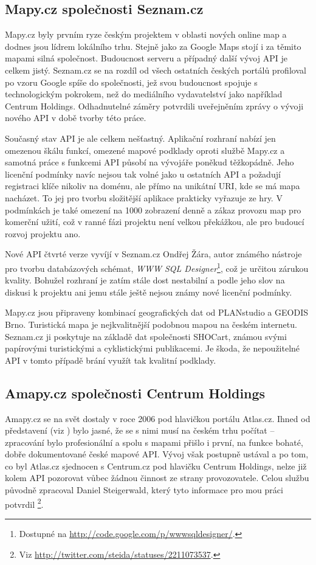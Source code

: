\subsection{Mapy.cz společnosti Seznam.cz}
Mapy.cz byly prvním ryze českým projektem v oblasti nových online map
a dodnes jsou lídrem lokálního trhu. Stejně jako za Google Maps stojí
i za těmito mapami silná společnost. Budoucnost serveru a případný
další vývoj API je celkem jistý. Seznam.cz se na rozdíl od všech
ostatních českých portálů profiloval po vzoru Google spíše do
společnosti, jež svou budoucnost spojuje s technologickým pokrokem,
než do mediálního vydavatelství jako například Centrum Holdings.
Odhadnutelné záměry potvrdili uveřejněním zprávy o vývoji nového
API \cite{apiSeznam} v době tvorby této práce.

Současný stav API je ale celkem nešťastný. Aplikační rozhraní nabízí
jen omezenou škálu funkcí, omezené mapové podklady oproti službě
Mapy.cz a samotná práce s funkcemi API působí na vývojáře poněkud
těžkopádně. Jeho licenční podmínky navíc nejsou tak volné jako u
ostatních API a požadují registraci klíče nikoliv na doménu, ale
přímo na unikátní URI, kde se má mapa nacházet. To jej pro tvorbu
složitější aplikace prakticky vyřazuje ze hry. V podmínkách je také
omezení na 1000 zobrazení denně a zákaz provozu map pro komerční
užití, což v ranné fázi projektu není velkou překážkou, ale pro
budoucí rozvoj projektu ano.

Nové API čtvrté verze vyvíjí v Seznam.cz Ondřej Žára, autor známého
nástroje pro tvorbu databázových schémat, {\it WWW SQL
Designer}\footnote{Dostupné na
\url{http://code.google.com/p/wwwsqldesigner/}.}, což je určitou zárukou kvality. Bohužel rozhraní je zatím stále dost
nestabilní a podle jeho slov na diskusi k projektu ani jemu stále
ještě nejsou známy nové licenční podmínky.

Mapy.cz jsou připraveny kombinací geografických dat od PLANstudio a
GEODIS Brno. Turistická mapa je nej\-kvalitnější podobnou mapou na českém
internetu. Seznam.cz ji poskytuje na základě dat společnosti SHOCart,
známou svými papírovými turistickými a cyklistickými publikacemi. Je
škoda, že nepoužitelné API v tomto případě brání využít tak kvalitní
podklady.

\subsection{Amapy.cz společnosti Centrum Holdings}
Amapy.cz se na svět dostaly v roce 2006 pod hlavičkou portálu
Atlas.cz. Ihned od představení (viz \cite{amapy}) bylo jasné, že se s
nimi musí na českém trhu počítat -- zpracování bylo profesionální a spolu s mapami přišlo
i první, na funkce bohaté, dobře dokumentované české mapové API. Vývoj
však postupně ustával a po tom, co byl Atlas.cz sjednocen s
Centrum.cz pod hlavičku Centrum Holdings, nelze již kolem API
pozorovat vůbec žádnou činnost ze strany provozovatele. Celou službu
původně zpracoval Daniel Steigerwald, který tyto informace pro mou
práci potvrdil
\footnote{Viz \url{http://twitter.com/steida/statuses/2211073537}.}.

